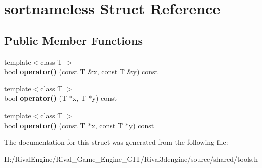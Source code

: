 \hypertarget{structsortnameless}{}\section{sortnameless Struct Reference}
\label{structsortnameless}
\subsection*{Public Member Functions}
\begin{DoxyCompactItemize}
\item 
\mbox{\label{structsortnameless_a7c5391baca7f4a0bc38a00f36deb8cbb}} 
{\footnotesize template$<$class T $>$ }\\bool {\bfseries operator()} (const T \&x, const T \&y) const
\item 
\mbox{\label{structsortnameless_ad06c4f79bc1bea50ad3be34ca24edff6}} 
{\footnotesize template$<$class T $>$ }\\bool {\bfseries operator()} (T $\ast$x, T $\ast$y) const
\item 
\mbox{\label{structsortnameless_af3362ec55049c083487a2fdef3e0aa98}} 
{\footnotesize template$<$class T $>$ }\\bool {\bfseries operator()} (const T $\ast$x, const T $\ast$y) const
\end{DoxyCompactItemize}


The documentation for this struct was generated from the following file\+:\begin{DoxyCompactItemize}
\item 
H\+:/\+Rival\+Engine/\+Rival\+\_\+\+Game\+\_\+\+Engine\+\_\+\+G\+I\+T/\+Rival3dengine/source/shared/tools.\+h\end{DoxyCompactItemize}
